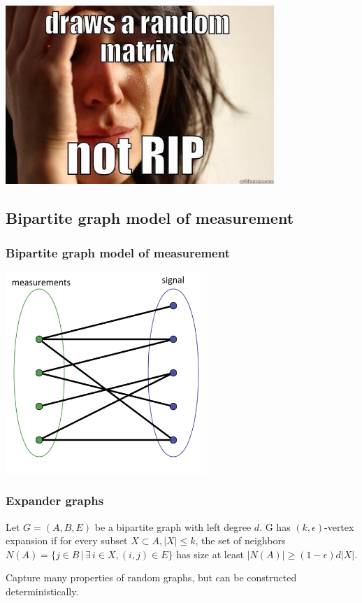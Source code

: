 \documentclass[aspectratio=34]{beamer}
\begin{document}
\begin{frame}
\includegraphics[width=4in]{rip.jpg}
\end{frame}


\subsection{Bipartite graph model of measurement}
\begin{frame}
\frametitle{Bipartite graph model of measurement}	
\includegraphics[width=3in]{bpgraph.png}
\end{frame}

\begin{frame}
\frametitle{Expander graphs}

\begin{definition}
	Let $G = (A,B,E)$ be a bipartite graph with left degree $d$. G has $(k,\epsilon)$-vertex expansion if for every subset $X \subset A, |X| \le k$, the set of neighbors $N(A) = \{j \in B \, | \, \exists \, i \in X, (i,j) \in E\}$ has size at least $|N(A)| \ge (1-\epsilon)d|X|$.
\end{definition}

Capture many properties of random graphs, but can be constructed deterministically. 

\end{frame}
\end{document}
